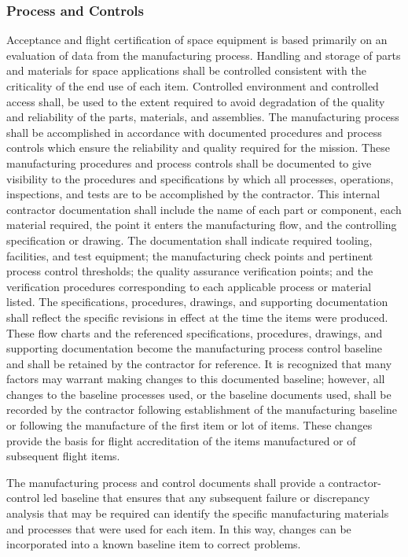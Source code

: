 \documentclass[12pt]{article}
\begin{document}
\subsubsection{Process and Controls} %
Acceptance and flight certification of space equipment is based primarily on an evaluation of data from the manufacturing process. 
Handling and storage of parts and materials for space applications shall be controlled consistent with the criticality of the end use of each item. 
Controlled environment and controlled access shall, be used to the extent required to avoid degradation of the quality and reliability of the parts, materials, and assemblies. 
The manufacturing process shall be accomplished in accordance with documented procedures and process controls which ensure the reliability and quality required for the mission.
These manufacturing procedures and process controls shall be documented to give visibility to the procedures and specifications by which all processes, operations, inspections, and tests are to be accomplished by the contractor. 
This internal contractor documentation shall include the name of each part or component, each material required, the point it enters the manufacturing flow, and the controlling specification or drawing. 
The documentation shall indicate required tooling, facilities, and test equipment; the manufacturing check points and pertinent process control thresholds; the quality assurance verification points; and the verification procedures corresponding to each applicable process or material listed.
The specifications, procedures, drawings, and supporting documentation shall reflect the specific revisions in effect at the time the items were produced. 
These flow charts and the referenced specifications, procedures, drawings, and supporting documentation become the manufacturing process control baseline and shall be retained by the contractor for reference. 
It is recognized that many factors may warrant making changes to this documented baseline; however, all changes to the baseline processes used, or the baseline documents used, shall be recorded by the contractor following establishment of the
manufacturing baseline or following the manufacture of the first item or lot of items. 
These changes provide the basis for flight accreditation of the items manufactured or of subsequent flight items.

The manufacturing process and control documents shall provide a contractor-control led baseline that ensures that any subsequent failure or discrepancy analysis that may be required can identify the specific manufacturing materials and processes that were used for each item. 
In this way, changes can be incorporated into a known baseline item to correct problems.
\end{document}
